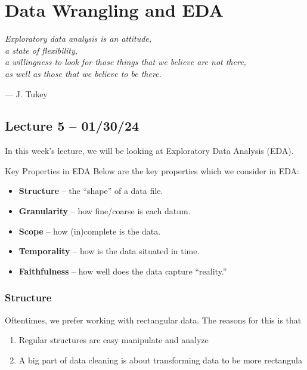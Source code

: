 \documentclass[openany]{book}
\begin{document}
\chapter{Data Wrangling and EDA}
\epigraph{\textit{Exploratory data analysis is an attitude,\\a state of flexibility,\\a willingness to look for those things that we believe are not there,\\as well as those that we believe to be there.}}{--- J. Tukey}
\section{Lecture 5 -- 01/30/24}
In this week's lecture, we will be looking at Exploratory Data Analysis (EDA).
\begin{miscbox}{Key Properties in EDA}
	Below are the key properties which we consider in EDA:
	\begin{itemize}
		\item \textbf{Structure} -- the “shape” of a data file.
		\item \textbf{Granularity} -- how fine/coarse is each datum.
		\item \textbf{Scope} -- how (in)complete is the data.
		\item \textbf{Temporality} -- how is the data situated in time.
		\item \textbf{Faithfulness} -- how well does the data capture “reality.”
	\end{itemize}
\end{miscbox}

\subsection{Structure}
Oftentimes, we prefer working with rectangular data. The reasons for this is that
\begin{enumerate}
	\item Regular structures are easy manipulate and analyze
	\item A big part of data cleaning is about 
	transforming data to be more rectangula
\end{enumerate}
\end{document}
